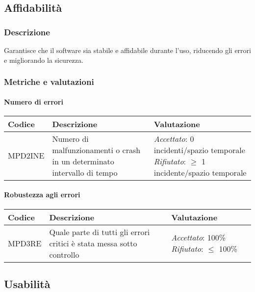 \subsection{Affidabilità}
\subsubsection{Descrizione}
Garantisce che il software sia stabile e affidabile durante l'uso, riducendo gli errori e migliorando la sicurezza.
\subsubsection{Metriche e valutazioni}
\paragraph{Numero di errori}

\begin{table}[h]
\centering
\begin{tabular}{ |>{\centering\arraybackslash}m{3cm}|>{\centering\arraybackslash}m{6cm}|>{\centering\arraybackslash}m{7cm}| }
\hline
Codice & Descrizione & Valutazione\\
\hline
MPD2INE & Numero di malfunzionamenti o crash in un determinato intervallo di tempo &
\textit{Accettato}:   0 incidenti/spazio temporale
\textit{Rifiutato}:  $\geq$ 1 incidente/spazio temporale\\
\hline
\end{tabular}
\end{table}

\paragraph{Robustezza agli errori}

\begin{table}[h]
\centering
\begin{tabular}{ |>{\centering\arraybackslash}m{3cm}|>{\centering\arraybackslash}m{10cm}|>{\centering\arraybackslash}m{3cm}| }
\hline
Codice & Descrizione & Valutazione\\
\hline
MPD3RE & Quale parte di tutti gli errori critici è stata messa sotto controllo &
\textit{Accettato}:   100\%
\textit{Rifiutato}:  $\leq$ 100\%\\
\hline
\end{tabular}
\end{table}

\subsection{Usabilità}
